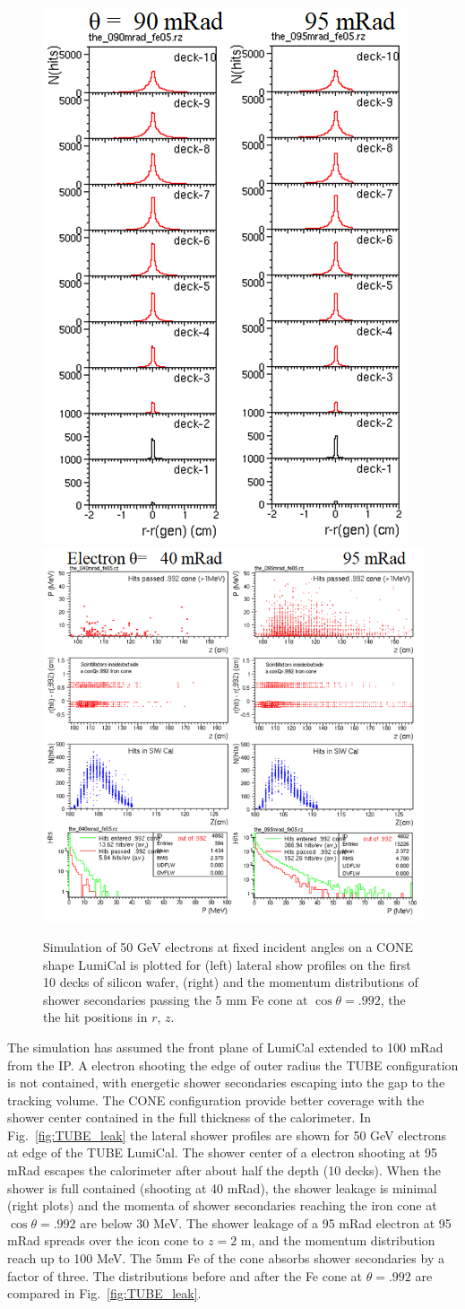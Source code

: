 \begin{figure}[bh!]
	\vspace{.5cm}
	\centering
	\includegraphics[width=.30\linewidth]{Figures/MDI/CONE_lateral.png}   
	\hspace{.5cm}
	\includegraphics[width=.45\linewidth]{Figures/MDI/CONE_lateral_p.png} 
	\vspace{-.2cm}
	\caption{ Simulation of 50 GeV electrons at fixed incident angles 
		on a CONE shape LumiCal is plotted for 
		(left) lateral show profiles on the first 10 decks of silicon wafer,
		(right) and the momentum distributions of shower secondaries passing
		the 5 mm Fe cone at $\cos\theta=.992$, the the hit positions in $r$, $z$.
		\label{fig:CONE_leak} }
\end{figure}

The simulation has assumed the front plane of LumiCal extended to 100 mRad
from the IP. A electron shooting the edge of outer radius the TUBE configuration
is not contained, with energetic shower secondaries escaping into the gap to the
tracking volume. The CONE configuration provide better coverage with 
the shower center contained in the full thickness of the calorimeter. 
In Fig.~\ref{fig:TUBE_leak} the lateral shower profiles are shown
for 50 GeV electrons at edge of the TUBE LumiCal. 
The shower center of a electron shooting at 95 mRad escapes the calorimeter
after about half the depth (10 decks). 
When the shower is full contained (shooting at 40 mRad), the shower leakage
is minimal (right plots) and the momenta of shower secondaries reaching the 
iron cone at $\cos\theta=.992$ are below 30 MeV. 
The shower leakage of a 95 mRad electron at 95 mRad spreads over the icon cone
to $z=2$ m, and the momentum distribution reach up to 100 MeV.
The 5mm Fe of the cone absorbs shower secondaries by a factor of three.
The distributions before and after the Fe cone at $\theta=.992$ are compared 
in  Fig.~\ref{fig:TUBE_leak}.


